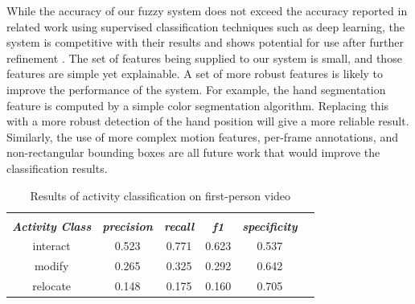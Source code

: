 \documentclass[12pt]{report}
\begin{document}
While the accuracy of our fuzzy system does not exceed the accuracy reported in related work using supervised classification techniques such as deep learning, the system is competitive with their results and shows potential for use after further refinement \cite{Pirsiavash2012, Koppula2016, Lu2019}. The set of features being supplied to our system is small, and those features are simple yet explainable. A set of more robust features is likely to improve the performance of the system. For example, the hand segmentation feature is computed by a simple color segmentation algorithm. Replacing this with a more robust detection of the hand position will give a more reliable result. Similarly, the use of more complex motion features, per-frame annotations, and non-rectangular bounding boxes are all future work that would improve the classification results.

\begin{table}
\caption{Results of activity classification on first-person video}
\begin{center}
\begin{tabular}{cccccc}
\hline \\
\textbf{\textit{Activity Class}} & \textbf{\textit{precision}} & \textbf{\textit{recall}} & \textbf{\textit{f1}} & \textbf{\textit{specificity}} \\
\hline
interact & 0.523 & 0.771 & 0.623 & 0.537 \\
modify & 0.265 & 0.325 & 0.292 & 0.642 \\
relocate & 0.148 & 0.175 & 0.160 & 0.705 \\
\hline
\end{tabular}
\label{results}
\end{center}
\end{table}
\end{document}
